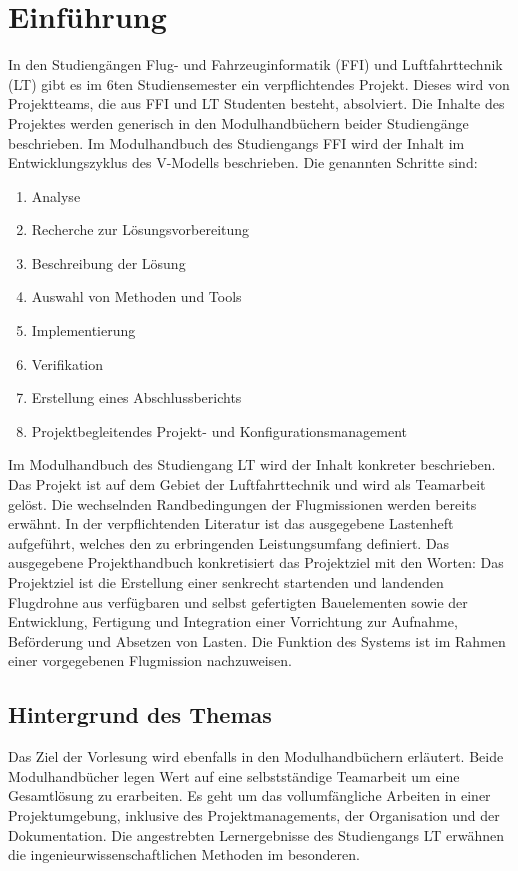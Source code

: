 \chapter{Einführung}

In den Studiengängen Flug- und Fahrzeuginformatik (FFI) und Luftfahrttechnik (LT) gibt es im 6ten Studiensemester ein verpflichtendes Projekt. Dieses wird von Projektteams, die aus FFI und LT Studenten besteht, absolviert. Die Inhalte des Projektes werden generisch in den Modulhandbüchern beider Studiengänge beschrieben. Im Modulhandbuch des Studiengangs FFI wird der Inhalt im Entwicklungszyklus des V-Modells beschrieben. Die genannten Schritte sind:
\begin{enumerate}
	\item Analyse
	\item Recherche zur Lösungsvorbereitung
	\item Beschreibung der Lösung
	\item Auswahl von Methoden und Tools
	\item Implementierung
	\item Verifikation
	\item Erstellung eines Abschlussberichts
	\item Projektbegleitendes Projekt- und Konfigurationsmanagement
\end{enumerate}
Im Modulhandbuch des Studiengang LT wird der Inhalt konkreter beschrieben. Das Projekt ist auf dem Gebiet der Luftfahrttechnik und wird als Teamarbeit gelöst. Die wechselnden Randbedingungen der Flugmissionen werden bereits erwähnt. In der verpflichtenden Literatur ist das ausgegebene Lastenheft aufgeführt, welches den zu erbringenden Leistungsumfang definiert.
Das ausgegebene Projekthandbuch konkretisiert das Projektziel mit den Worten: Das Projektziel ist die Erstellung einer senkrecht startenden und landenden Flugdrohne aus verfügbaren und selbst gefertigten Bauelementen sowie der Entwicklung, Fertigung und Integration einer Vorrichtung zur Aufnahme, Beförderung und Absetzen von Lasten. Die Funktion des Systems ist im Rahmen einer vorgegebenen Flugmission nachzuweisen.

\section{Hintergrund des Themas}
Das Ziel der Vorlesung wird ebenfalls in den Modulhandbüchern erläutert. Beide Modulhandbücher legen Wert auf eine selbstständige Teamarbeit um eine Gesamtlösung zu erarbeiten. Es geht um das vollumfängliche Arbeiten in einer Projektumgebung, inklusive des Projektmanagements, der Organisation und der Dokumentation. Die angestrebten Lernergebnisse des Studiengangs LT erwähnen die ingenieurwissenschaftlichen Methoden im besonderen.

